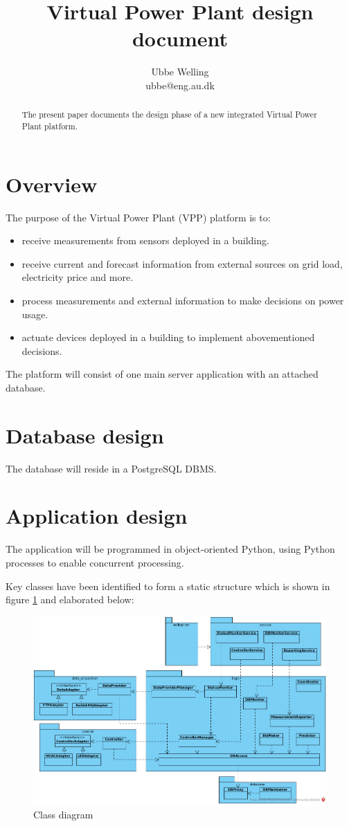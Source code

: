 \documentclass{article}
\begin{document}
\title{Virtual Power Plant design document}
\author{Ubbe Welling\\ubbe@eng.au.dk}

\maketitle
\begin{abstract}
The present paper documents the design phase of a new integrated Virtual Power Plant platform.
\end{abstract}



\setcounter{tocdepth}{2}
\tableofcontents

\section{Overview}
The purpose of the Virtual Power Plant (VPP) platform is to:
\begin{itemize}
	\item receive measurements from sensors deployed in a building.
	\item receive current and forecast information from external sources on grid load, electricity price and more.
	\item process measurements and external information to make decisions on power usage.
	\item actuate devices deployed in a building to implement abovementioned decisions.
\end{itemize} 

The platform will consist of one main server application with an attached database. 

\section{Database design}
The database will reside in a PostgreSQL DBMS.


\section{Application design}
The application will be programmed in object-oriented Python, using Python processes to enable concurrent processing.

Key classes have been identified to form a static structure which is shown in figure \ref{figureClassDiagram} and elaborated below:

\begin{figure}[H]
    \centering
    \includegraphics[width=\textwidth]{figures/class_diagram}
    \caption{Class diagram}
    \label{figureClassDiagram}
\end{figure}




%
\end{document}
